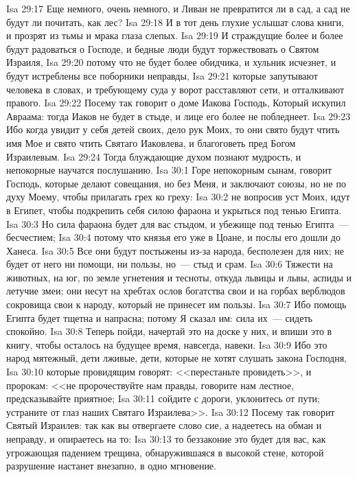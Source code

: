 \vs Isa 29:17 Еще немного, очень немного, и Ливан не превратится ли в сад, а сад не будут ли почитать, как лес?
\vs Isa 29:18 И в тот день глухие услышат слова книги, и прозрят из тьмы и мрака глаза слепых.
\vs Isa 29:19 И страждущие более и более будут радоваться о Господе, и бедные люди будут торжествовать о Святом Израиля,
\vs Isa 29:20 потому что не будет более обидчика, и хульник исчезнет, и будут истреблены все поборники неправды,
\vs Isa 29:21 которые запутывают человека в словах, и требующему суда у ворот расставляют сети, и отталкивают правого.
\vs Isa 29:22 Посему так говорит о доме Иакова Господь, Который искупил Авраама: тогда Иаков не будет в стыде, и лице его более не побледнеет.
\vs Isa 29:23 Ибо когда увидит у себя детей своих, дело рук Моих, то они свято будут чтить имя Мое и свято чтить Святаго Иаковлева, и благоговеть пред Богом Израилевым.
\vs Isa 29:24 Тогда блуждающие духом познают мудрость, и непокорные научатся послушанию.
\vs Isa 30:1 Горе непокорным сынам, говорит Господь, которые делают совещания, но без Меня, и заключают союзы, но не по духу Моему, чтобы прилагать грех ко греху:
\vs Isa 30:2 не вопросив уст Моих, идут в Египет, чтобы подкрепить себя силою фараона и укрыться под тенью Египта.
\vs Isa 30:3 Но сила фараона будет для вас стыдом, и убежище под тенью Египта~--- бесчестием;
\vs Isa 30:4 потому что князья его уже в Цоане, и послы его дошли до Ханеса.
\vs Isa 30:5 Все они будут постыжены из-за народа,  бесполезен для них; не будет от него ни помощи, ни пользы, но~--- стыд и срам.
\vs Isa 30:6 Тяжести на животных,  на юг, по земле угнетения и тесноты, откуда  львицы и львы, аспиды и летучие змеи; они несут на хребтах ослов богатства свои и на горбах верблюдов сокровища свои к народу, который не принесет им пользы.
\vs Isa 30:7 Ибо помощь Египта будет тщетна и напрасна; потому Я сказал им: сила их~--- сидеть спокойно.
\vs Isa 30:8 Теперь пойди, начертай это на доске у них, и впиши это в книгу, чтобы осталось на будущее время, навсегда, навеки.
\vs Isa 30:9 Ибо это народ мятежный, дети лживые, дети, которые не хотят слушать закона Господня,
\vs Isa 30:10 которые провидящим говорят: <<перестаньте провидеть>>, и пророкам: <<не пророчествуйте нам правды, говорите нам лестное, предсказывайте приятное;
\vs Isa 30:11 сойдите с дороги, уклонитесь от пути; устраните от глаз наших Святаго Израилева>>.
\rsbpar\vs Isa 30:12 Посему так говорит Святый Израилев: так как вы отвергаете слово сие, а надеетесь на обман и неправду, и опираетесь на то:
\vs Isa 30:13 то беззаконие это будет для вас, как угрожающая падением трещина, обнаружившаяся в высокой стене, которой разрушение настанет внезапно, в одно мгновение.

